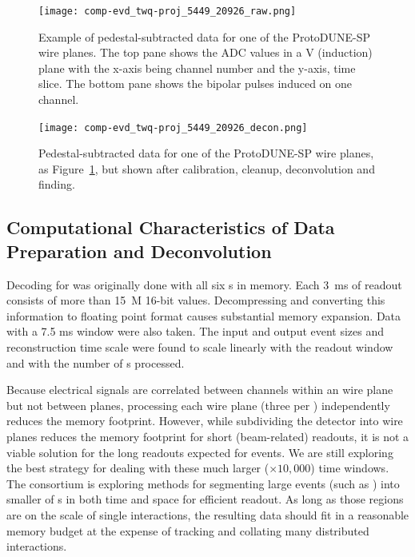 \begin{figure}[t]
\texttt{[image: comp-evd\_twq-proj\_5449\_20926\_raw.png]}
\caption[Example of pedestal-subtracted data for one of the ProtoDUNE-SP  wire planes]{Example of pedestal-subtracted data for one of the ProtoDUNE-SP  wire planes.  The top pane shows the ADC values in a V (induction) plane with the x-axis being channel number and the y-axis, time slice. The bottom pane shows the bipolar pulses induced on one channel. 
}
\label{fig:ch-exec-comp-chtraw}
\end{figure}


\begin{figure}[t]
 \texttt{[image: comp-evd\_twq-proj\_5449\_20926\_decon.png]}
\caption[Pedestal-subtracted data for one of the ProtoDUNE-SP  wire planes, additional processing]{
Pedestal-subtracted data for one of the ProtoDUNE-SP  wire planes, as Figure~\ref{fig:ch-exec-comp-chtraw}, but shown after calibration, cleanup, deconvolution and  finding. 
}
\label{fig:ch-exec-comp-chtroi}
\end{figure}


\subsection{Computational Characteristics of Data Preparation and Deconvolution }

Decoding for  was originally done with all six s in memory. Each \SI{3}{ms} of  readout consists of more than \SI{15}{M} 16-bit values. Decompressing and converting this information to floating point format causes substantial memory expansion. 
  Data with a 7.5 ms window were also taken. 
The input and output event sizes and reconstruction time scale were found to scale linearly with the readout window and with the number of s processed. 


Because electrical signals are correlated between channels within an  wire plane but not between planes, processing each wire plane (three per ) independently reduces the memory footprint.
However,  while subdividing the detector into wire planes reduces the memory footprint for short (beam-related) readouts, it is  not a viable solution for the long readouts expected for  events. We are still exploring the best strategy for dealing with these much larger ($\times 10,000$) time windows. 
The  consortium is exploring methods for segmenting large events (such as ) into  smaller of s in both time and space for efficient readout.  As long as those regions are on the scale of single interactions, the resulting data should fit in a reasonable memory budget at the expense of tracking and collating many distributed interactions. 


